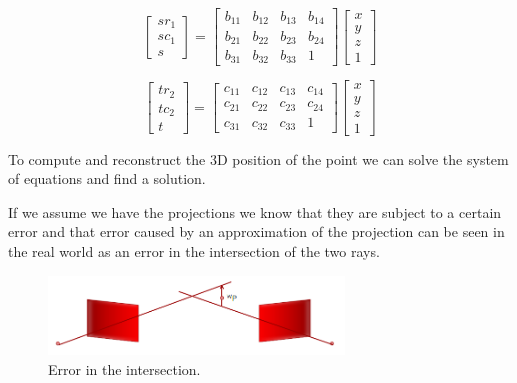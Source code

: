 \begin{multicols}{2}

    \[
        \begin{bmatrix}
            sr_1 \\
            sc_1 \\
            s
        \end{bmatrix}  
        =
        \begin{bmatrix}
            b_{11} & b_{12} & b_{13} & b_{14} \\
            b_{21} & b_{22} & b_{23} & b_{24} \\
            b_{31} & b_{32} & b_{33} & 1
        \end{bmatrix}
        \begin{bmatrix}
            x \\
            y \\
            z \\
            1
        \end{bmatrix}
    \]

    \[
        \begin{bmatrix}
            tr_2 \\
            tc_2 \\
            t
        \end{bmatrix}  
        =
        \begin{bmatrix}
            c_{11} & c_{12} & c_{13} & c_{14} \\
            c_{21} & c_{22} & c_{23} & c_{24} \\
            c_{31} & c_{32} & c_{33} & 1
        \end{bmatrix}
        \begin{bmatrix}
            x \\
            y \\
            z \\
            1
        \end{bmatrix}
    \]
\end{multicols}

To compute and reconstruct the 3D position of the point we can solve the system of equations and find a solution.

If we assume we have the projections we know that they are subject to a certain error and that error caused by an approximation of the projection can be seen in the real world as an error in the intersection of the two rays.


\begin{figure}[H]
    \centering
    \includegraphics[width=0.7\textwidth]{Figures/inter.png}
    \caption{Error in the intersection.}
    \label{fig:inter}
\end{figure}

